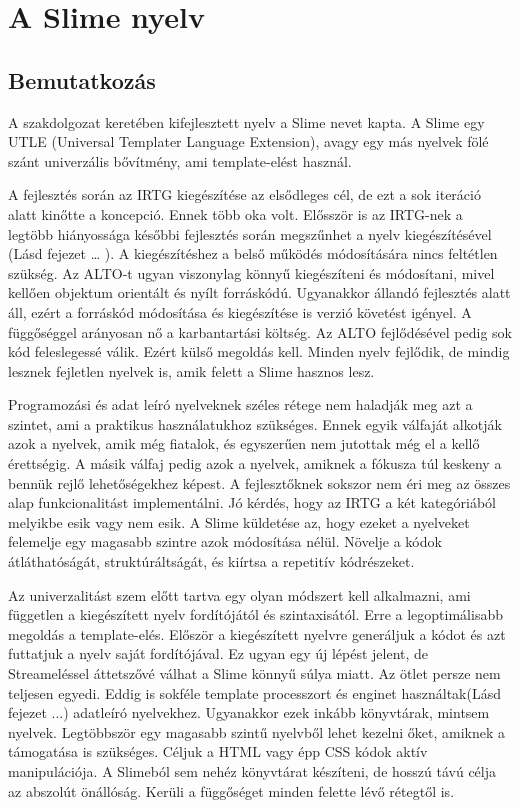 \chapter{A Slime nyelv}
\label{sec:Slime}
\section{Bemutatkozás}
A szakdolgozat keretében kifejlesztett nyelv a Slime nevet kapta.
A Slime egy UTLE (Universal Templater Language Extension), 
avagy egy más nyelvek fölé szánt univerzális bővítmény, ami template-elést használ.

A fejlesztés során az IRTG kiegészítése az elsődleges cél, de ezt a sok iteráció alatt kinőtte a koncepció. 
Ennek több oka volt. 
Elősször is az IRTG-nek a legtöbb hiányossága későbbi fejlesztés során megszűnhet a nyelv kiegészítésével (Lásd fejezet … ). 
A kiegészítéshez a belső működés módosítására nincs feltétlen szükség. 
Az ALTO-t ugyan viszonylag könnyű kiegészíteni és módosítani, mivel kellően objektum orientált és nyílt forráskódú.
Ugyanakkor állandó fejlesztés alatt áll, ezért a forráskód módosítása és kiegészítése is verzió követést igényel. 
A függőséggel arányosan nő a karbantartási költség. 
Az ALTO fejlődésével pedig sok kód feleslegessé válik. 
Ezért külső megoldás kell. 
Minden nyelv fejlődik, de mindig lesznek fejletlen nyelvek is, amik felett a Slime hasznos lesz.


Programozási és adat leíró nyelveknek széles rétege nem haladják meg azt a szintet, ami a  praktikus használatukhoz szükséges. 
Ennek egyik válfaját alkotják azok a nyelvek, amik még fiatalok, és egyszerűen nem jutottak még el a kellő érettségig. 
A másik válfaj pedig azok a nyelvek, amiknek a fókusza túl keskeny a bennük rejlő lehetőségekhez képest.
A fejlesztőknek sokszor nem éri meg az összes alap funkcionalitást implementálni. 
Jó kérdés, hogy az IRTG a két kategóriából melyikbe esik vagy nem esik. 
A Slime küldetése az, hogy ezeket a nyelveket felemelje egy magasabb szintre azok módosítása nélül. 
Növelje a kódok átláthatóságát, struktúráltságát, és kiírtsa a repetitív kódrészeket.

Az univerzalitást szem előtt tartva egy olyan módszert kell alkalmazni, ami független a kiegészített nyelv fordítójától és szintaxisától. 
Erre a legoptimálisabb megoldás a template-elés. 
Először a kiegészített nyelvre generáljuk a kódot és azt futtatjuk a nyelv saját fordítójával. 
Ez ugyan egy új lépést jelent, de Streameléssel áttetszővé válhat a Slime könnyű súlya miatt. 
Az ötlet persze nem teljesen egyedi. 
Eddig is sokféle template processzort és enginet használtak(Lásd fejezet ...) adatleíró nyelvekhez. 
Ugyanakkor ezek inkább könyvtárak, mintsem nyelvek.
Legtöbbször egy magasabb szintű nyelvből lehet kezelni őket, amiknek a támogatása is szükséges. 
Céljuk a HTML vagy épp CSS kódok aktív manipulációja. 
A Slimeból sem nehéz könyvtárat készíteni, de hosszú távú célja az abszolút önállóság. 
Kerüli a függőséget minden felette lévő rétegtől is.

